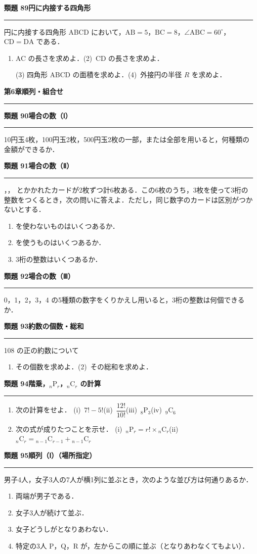 \documentclass[a4paper,11pt]{ltjsarticle}
\newcommand{\mon}[2]{\Needspace{7\baselineskip}\vspace{10pt}%
  {\sffamily\bfseries 類題 #1\quad #2\par}\vspace{2pt}\hrule\vspace{4pt}}
\newcommand{\shou}[2]{\clearpage\markboth{#1\quad #2}{}%
  {\sffamily\bfseries\LARGE #1\quad #2\par}\vspace{2pt}\hrule height 1.2pt\vspace{4pt}}
\begin{document}
\mon{89}{円に内接する四角形}
円に内接する四角形 ABCD において，$\mathrm{AB}=5$，$\mathrm{BC}=8$，$\angle\mathrm{ABC}=60^\circ$，$\mathrm{CD}=\mathrm{DA}$ である．
\begin{enumerate}
\item AC の長さを求めよ．\qquad (2)\ CD の長さを求めよ．
\item[(3)] 四角形 ABCD の面積を求めよ．\qquad (4)\ 外接円の半径 $R$ を求めよ．
\end{enumerate}


\shou{第6章}{順列・組合せ}
\mon{90}{場合の数（Ⅰ）}
10円玉4枚，100円玉2枚，500円玉2枚の一部，または全部を用いると，何種類の金額ができるか．

\mon{91}{場合の数（Ⅱ）}
，， とかかれたカードが2枚ずつ計6枚ある．この6枚のうち，3枚を使って3桁の整数をつくるとき，次の問いに答えよ．ただし，同じ数字のカードは区別がつかないとする．
\begin{enumerate}
\item {} を使わないものはいくつあるか．
\item {} を使うものはいくつあるか．
\item 3桁の整数はいくつあるか．
\end{enumerate}

\mon{92}{場合の数（Ⅲ）}
0，1，2，3，4 の5種類の数字をくりかえし用いると，3桁の整数は何個できるか．

\mon{93}{約数の個数・総和}
108 の正の約数について
\begin{enumerate}
\item その個数を求めよ．\qquad (2)\ その総和を求めよ．
\end{enumerate}

\mon{94}{階乗，${}_n\mathrm P_r$，${}_n\mathrm C_r$ の計算}
\begin{enumerate}
\item 次の計算をせよ．\quad
(i)\ $7!-5!$\qquad (ii)\ $\dfrac{12!}{10!}$\qquad (iii)\ ${}_8\mathrm P_3$\qquad (iv)\ ${}_9\mathrm C_6$
\item 次の式が成りたつことを示せ．\quad
(i)\ ${}_n\mathrm P_r=r!\times{}_n\mathrm C_r$\qquad (ii)\ ${}_n\mathrm C_r={}_{n-1}\mathrm C_{r-1}+{}_{n-1}\mathrm C_r$
\end{enumerate}

\mon{95}{順列（Ⅰ）（場所指定）}
男子4人，女子3人の7人が横1列に並ぶとき，次のような並び方は何通りあるか．
\begin{enumerate}
\item 両端が男子である．
\item 女子3人が続けて並ぶ．
\item 女子どうしがとなりあわない．
\item 特定の3人 P，Q，R が，左からこの順に並ぶ（となりあわなくてもよい）．
\end{enumerate}
\end{document}
